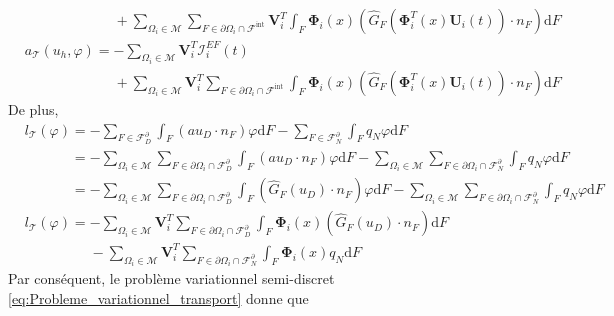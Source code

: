 \documentclass[11pt, a4paper, oneside]{report}
\begin{document}
\begin{appendices}
\begin{equation}
\begin{aligned}
        &\phantom{a_\mathcal{T}(u_h, \varphi) =} +\sum_{\Omega_i \in \mathcal{M}} \sum_{F \in \partial \Omega_i \cap \mathcal{F}^\text{int}} \bm{V}_i^T \int_F \bm{\Phi}_i(x) \left( \widehat{G}_F \left( \bm{\Phi}_i^T(x) \bm{U}_i(t) \right) \cdot n_F \right) \text{d}F \\
        &a_\mathcal{T}(u_h, \varphi) = - \sum_{\Omega_i \in \mathcal{M}} \bm{V}_i^T \bm{\mathcal{I}}_i^{EF}(t) \\
        &\phantom{a_\mathcal{T}(u_h, \varphi) =} + \sum_{\Omega_i \in \mathcal{M}} \bm{V}_i^T \sum_{F \in \partial \Omega_i \cap \mathcal{F}^\text{int}} \int_F \bm{\Phi}_i(x) \left( \widehat{G}_F \left( \bm{\Phi}_i^T(x) \bm{U}_i(t) \right) \cdot n_F \right) \text{d}F
    \end{aligned}
\end{equation}
De plus,
\begin{equation}
    \begin{aligned}
        &l_\mathcal{T}(\varphi) = - \sum_{F \in \mathcal{F}_D^\partial} \int_F (a u_D \cdot n_F) \varphi \text{d}F - \sum_{F \in \mathcal{F}_N^\partial} \int_F q_N \varphi \text{d}F \\
        &\phantom{l_\mathcal{T}(\varphi) } = - \sum_{\Omega_i \in \mathcal{M}} \sum_{F \in \partial \Omega_i \cap \mathcal{F}_D^\partial} \int_F (au_D \cdot n_F) \varphi \text{d}F - \sum_{\Omega_i \in \mathcal{M}} \sum_{F \in \partial \Omega_i \cap \mathcal{F}_N^\partial} \int_F q_N \varphi \text{d}F \\
        &\phantom{l_\mathcal{T}(\varphi) } = - \sum_{\Omega_i \in \mathcal{M}} \sum_{F \in \partial \Omega_i \cap \mathcal{F}_D^\partial} \int_F (\widehat{G}_F(u_D) \cdot n_F) \varphi \text{d}F - \sum_{\Omega_i \in \mathcal{M}} \sum_{F \in \partial \Omega_i \cap \mathcal{F}_N^\partial} \int_F q_N \varphi \text{d}F \\
        &l_\mathcal{T}(\varphi) = - \sum_{\Omega_i \in \mathcal{M}} \bm{V}_i^T \sum_{F \in \partial \Omega_i \cap \mathcal{F}_D^\partial} \int_F \bm{\Phi}_i(x) (\widehat{G}_F(u_D) \cdot n_F) \text{d}F \\
        &\phantom{l_\mathcal{T}(\varphi) =} - \sum_{\Omega_i \in \mathcal{M}} \bm{V}_i^T \sum_{F \in \partial \Omega_i \cap \mathcal{F}_N^\partial} \int_F \bm{\Phi}_i(x) q_N \text{d}F
    \end{aligned}
\end{equation}
Par conséquent, le problème variationnel semi-discret \eqref{eq:Probleme_variationnel_transport} donne que
\begin{equation} \label{eq:Developpement_formulation_variationnelle_transport}

\end{equation}
\end{appendices}
\end{document}
